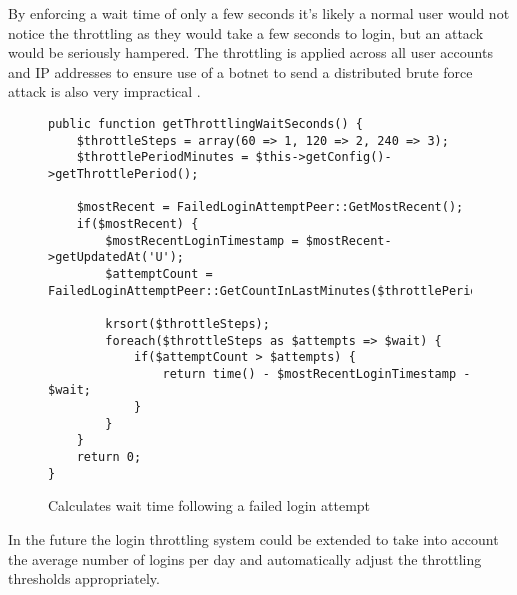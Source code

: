 By enforcing a wait time of only a few seconds  it's likely a normal user would not notice the throttling as they would take a few seconds to login, but an attack would be seriously hampered.
%
The throttling is applied across all user accounts and IP addresses to ensure use of a botnet to send a distributed brute force attack is also very impractical \parencite{stackoverflow2013authentication}.

\begin{figure}
\centering
\begin{lstlisting}[style=phpcolor]
public function getThrottlingWaitSeconds() {
	$throttleSteps = array(60 => 1, 120 => 2, 240 => 3);
	$throttlePeriodMinutes = $this->getConfig()->getThrottlePeriod();
	
	$mostRecent = FailedLoginAttemptPeer::GetMostRecent();		
	if($mostRecent) {
		$mostRecentLoginTimestamp = $mostRecent->getUpdatedAt('U');
		$attemptCount = FailedLoginAttemptPeer::GetCountInLastMinutes($throttlePeriodMinutes);
		
		krsort($throttleSteps);
		foreach($throttleSteps as $attempts => $wait) {
			if($attemptCount > $attempts) {
				return time() - $mostRecentLoginTimestamp - $wait;
			}
		}
	}
	return 0;
}
\end{lstlisting}
\caption{Calculates wait time following a failed login attempt}
\label{fig:getThrottlingWaitSeconds}
\end{figure}

In the future the login throttling system could be extended to take into account the average number of logins per day and automatically adjust the throttling thresholds appropriately.



